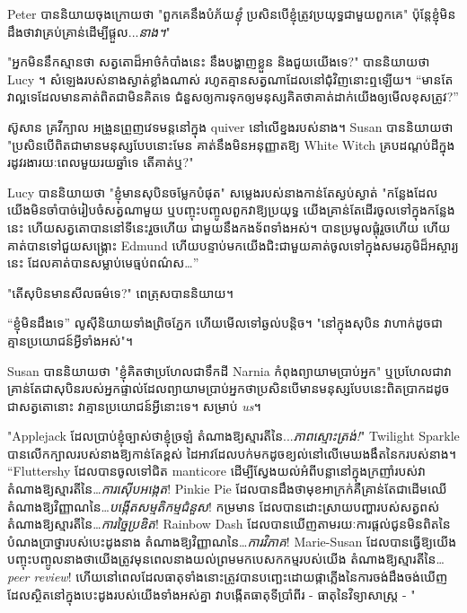 Peter បាននិយាយចុងក្រោយថា "ពួកគេនឹងបំភ័យ\emph{ខ្ញុំ} ប្រសិនបើខ្ញុំត្រូវប្រយុទ្ធជាមួយពួកគេ" ប៉ុន្តែខ្ញុំមិនដឹងថាវាគ្រប់គ្រាន់ដើម្បីផ្តួល...\emph{នាង។}"

"អ្នកមិននឹកស្មានថា សត្វតោដ៏អាថ៌កំបាំងនេះ នឹងបង្ហាញខ្លួន និងជួយយើងទេ?" បាននិយាយថា Lucy ។ សំឡេងរបស់នាងស្ងាត់ខ្លាំងណាស់ រហូតគ្មានសត្វណាដែលនៅជុំវិញនោះឮឡើយ។ “មានតែ​វា​ល្អ​ទេ​ដែល​មាន​គាត់​ពិត​ជា​មិន​គិត​ទេ ជំនួស​ឲ្យ​ការ​ទុក​ឲ្យ​មនុស្ស​គិត​ថា​គាត់​ដាក់​យើង​ឲ្យ​មើល​ខុស​ត្រូវ?”

ស៊ូសាន គ្រវីក្បាល អង្រួនព្រួញវេទមន្តនៅក្នុង quiver នៅលើខ្នងរបស់នាង។ Susan បាននិយាយថា "ប្រសិនបើពិតជាមានមនុស្សបែបនោះមែន គាត់នឹងមិនអនុញ្ញាតឱ្យ White Witch គ្របដណ្ដប់ដីក្នុងរដូវរងារយៈពេលមួយរយឆ្នាំទេ តើគាត់ឬ?"

Lucy បាននិយាយថា "ខ្ញុំមានសុបិនចម្លែកបំផុត" សម្លេងរបស់នាងកាន់តែស្ងប់ស្ងាត់ "កន្លែងដែលយើងមិនចាំបាច់រៀបចំសត្វណាមួយ ឬបញ្ចុះបញ្ចូលពួកវាឱ្យប្រយុទ្ធ យើងគ្រាន់តែដើរចូលទៅក្នុងកន្លែងនេះ ហើយសត្វតោបាននៅទីនេះរួចហើយ ជាមួយនឹងកងទ័ពទាំងអស់។ បានប្រមូលផ្តុំរួចហើយ ហើយគាត់បានទៅជួយសង្គ្រោះ Edmund ហើយបន្ទាប់មកយើងជិះជាមួយគាត់ចូលទៅក្នុងសមរភូមិដ៏អស្ចារ្យនេះ ដែលគាត់បានសម្លាប់មេធ្មប់ពណ៌ស…”

"តើសុបិនមានសីលធម៌ទេ?" ពេត្រុសបាននិយាយ។

“ខ្ញុំមិនដឹងទេ” លូស៊ីនិយាយទាំងព្រិចភ្នែក ហើយមើលទៅឆ្ងល់បន្តិច។ "នៅក្នុងសុបិន វាហាក់ដូចជាគ្មានប្រយោជន៍អ្វីទាំងអស់"។

Susan បាននិយាយថា "ខ្ញុំគិតថាប្រហែលជាទឹកដី Narnia កំពុងព្យាយាមប្រាប់អ្នក" ឬប្រហែលជាវាគ្រាន់តែជាសុបិនរបស់អ្នកផ្ទាល់ដែលព្យាយាមប្រាប់អ្នកថាប្រសិនបើមានមនុស្សបែបនេះពិតប្រាកដដូចជាសត្វតោនោះ វាគ្មានប្រយោជន៍អ្វីនោះទេ។ សម្រាប់ \emph{us}។


"Applejack ដែលប្រាប់ខ្ញុំច្បាស់ថាខ្ញុំច្រឡំ តំណាងឱ្យស្មារតីនៃ...\emph{ភាពស្មោះត្រង់!}" Twilight Sparkle បានលើកក្បាលរបស់នាងឱ្យកាន់តែខ្ពស់ ដៃអាវដែលបក់មកដូចខ្យល់នៅលើមេឃងងឹតនៃករបស់នាង។ “Fluttershy ដែលបានចូលទៅជិត manticore ដើម្បីស្វែងយល់អំពីបន្លានៅក្នុងក្រញាំរបស់វា តំណាងឱ្យស្មារតីនៃ…\emph{ការស៊ើបអង្កេត}! Pinkie Pie ដែល​បាន​ដឹង​ថា​មុខ​អាក្រក់​គឺ​គ្រាន់​តែ​ជា​ដើម​ឈើ​តំណាង​ឱ្យ​វិញ្ញាណ​នៃ…\emph{បង្កើត​សម្មតិកម្ម​ជំនួស}! កម្រមាន ដែលបានដោះស្រាយបញ្ហារបស់សត្វពស់តំណាងឱ្យស្មារតីនៃ…\emph{ការច្នៃប្រឌិត}! Rainbow Dash ដែល​បាន​ឃើញ​តាម​រយៈ​ការ​ផ្តល់​ជូន​មិន​ពិត​នៃ​បំណង​ប្រាថ្នា​របស់​បេះដូង​នាង តំណាង​ឱ្យ​វិញ្ញាណ​នៃ…\emph{ការវិភាគ}! Marie-Susan ដែល​បាន​ធ្វើ​ឱ្យ​យើង​បញ្ចុះបញ្ចូល​នាង​ថា​យើង​ត្រូវ​មុន​ពេល​នាង​យល់ព្រម​មក​បេសកកម្ម​របស់​យើង តំណាង​ឱ្យ​ស្មារតី​នៃ…\emph{peer review}! ហើយនៅពេលដែលធាតុទាំងនោះត្រូវបានបញ្ឆេះដោយផ្កាភ្លើងនៃការចង់ដឹងចង់ឃើញដែលស្ថិតនៅក្នុងបេះដូងរបស់យើងទាំងអស់គ្នា វាបង្កើតធាតុទីប្រាំពីរ - ធាតុនៃវិទ្យាសាស្ត្រ - "

